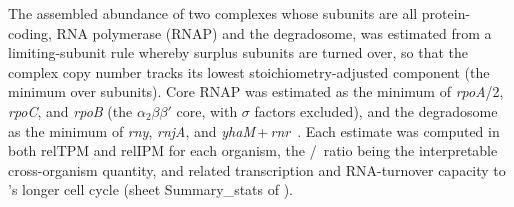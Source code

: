 The assembled abundance of two complexes whose subunits are all protein-coding, RNA polymerase (RNAP) and the degradosome, was estimated from a limiting-subunit rule whereby surplus subunits are turned over, so that the complex copy number tracks its lowest stoichiometry-adjusted component (the minimum over subunits).
Core RNAP was estimated as the minimum of \textit{rpoA}/2, \textit{rpoC}, and \textit{rpoB} (the $\alpha_2\beta\beta'$ core, with $\sigma$ factors excluded), and the degradosome as the minimum of \textit{rny}, \textit{rnjA}, and \textit{yhaM}\,+\,\textit{rnr}~\cite{fu_assembly_2026}.
Each estimate was computed in both relTPM and relIPM for each organism, the \syna/\syn~ratio being the interpretable cross-organism quantity, and related transcription and RNA-turnover capacity to \syna's longer cell cycle (sheet Summary\_stats of \sdreduction).
